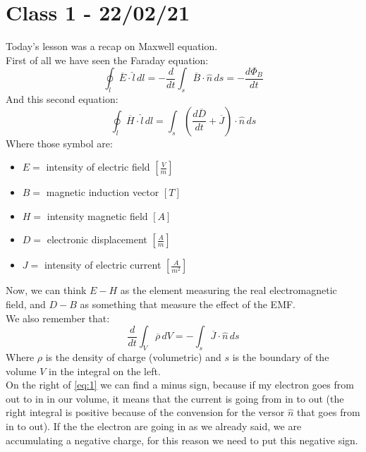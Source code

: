 \section{Class 1 - 22/02/21}
Today's lesson was a recap on Maxwell equation.\\
First of all we have seen the Faraday equation:
\begin{equation}\label{eq:first_maxwell}
 \oint_l \overline{E} \cdot \hat{l} \, dl = -\frac{d}{dt}\int_s \overline{B} \cdot \hat{n} \, ds = - \frac{d\Phi_B}{dt}
\end{equation}
And this second equation:
\begin{equation}
\oint_l \overline{H}\cdot \hat{l} \, dl = \int_s \left(\frac{d\overline{D}}{dt}+\overline{J}\right)\cdot \hat{n}\,ds
\end{equation}
Where those symbol are:
\begin{itemize}
\item $E=$ intensity of electric field $[\frac{V}{m}]$
\item $B=$ magnetic induction vector $[T]$
\item $H=$ intensity magnetic field $[A]$
\item $D=$ electronic displacement $[\frac{A}{m}]$
\item $J=$ intensity of electric current $[\frac{A}{m^2}]$
\end{itemize}
Now, we can think $E - H$ as the element measuring the real electromagnetic field, and $D - B$ as something that measure the effect of the EMF.\\
We also remember that:
\begin{equation}\label{eq:1}
\frac{d}{dt}\int_V \overline{\rho} \, dV=-\int_s \overline{J}\cdot \hat{n}\,ds
\end{equation}
Where $\rho$ is the density of charge (volumetric) and $s$ is the boundary of the volume $V$ in the integral on the left.\\
On the right of \cref{eq:1} we can find a minus sign, because if my electron goes from out to in in our volume, it means that the current is going from in to out (the right integral is positive because of the convension for the versor $\hat{n}$ that goes from in to out). If the the electron are going in as we already said, we are accumulating a negative charge, for this reason we need to put this negative sign.
